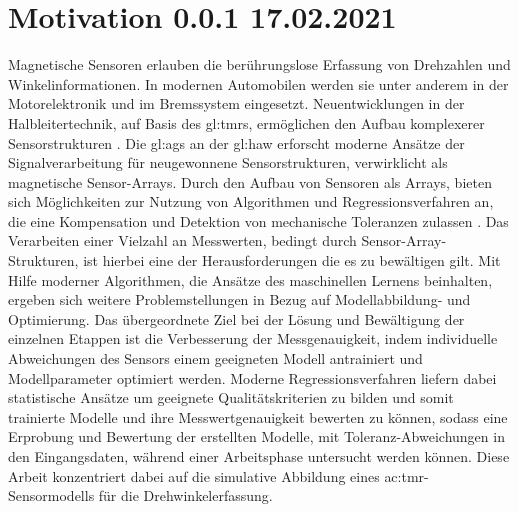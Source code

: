 %

\chapter{Motivation 0.0.1 17.02.2021}\label{ch:motivation}


Magnetische Sensoren erlauben die berührungslose Erfassung von Drehzahlen und Winkelinformationen. In modernen Automobilen werden sie unter anderem in der Motorelektronik und im Bremssystem eingesetzt. Neuentwicklungen in der Halbleitertechnik, auf Basis des \gls{gl:tmr}s, ermöglichen den Aufbau komplexerer Sensorstrukturen \cite{Schuethe2019}. Die \gls{gl:ags} an der \gls{gl:haw} erforscht moderne Ansätze der Signalverarbeitung für neugewonnene Sensorstrukturen, verwirklicht als magnetische Sensor-Arrays. Durch den Aufbau von Sensoren als Arrays, bieten sich Möglichkeiten zur Nutzung von Algorithmen und Regressionsverfahren an, die eine Kompensation und Detektion von mechanische Toleranzen zulassen \cite{Schuethe2020}.
\newline
Das Verarbeiten einer Vielzahl an Messwerten, bedingt durch Sensor-Array-Strukturen, ist hierbei eine der Herausforderungen die es zu bewältigen gilt. Mit Hilfe moderner Algorithmen, die Ansätze des maschinellen Lernens beinhalten, ergeben sich weitere Problemstellungen in Bezug auf Modellabbildung- und Optimierung.
Das übergeordnete Ziel bei der Lösung und Bewältigung der einzelnen Etappen ist die Verbesserung der Messgenauigkeit, indem individuelle Abweichungen des Sensors einem geeigneten Modell antrainiert und Modellparameter optimiert werden.
\newline
Moderne Regressionsverfahren liefern dabei statistische Ansätze um geeignete Qualitätskriterien zu bilden und somit trainierte Modelle und ihre Messwertgenauigkeit bewerten zu können, sodass eine Erprobung und Bewertung der erstellten Modelle, mit Toleranz-Abweichungen in den Eingangsdaten, während einer Arbeitsphase untersucht werden können.
Diese Arbeit konzentriert dabei auf die simulative Abbildung eines \gls{ac:tmr}-Sensormodells für die Drehwinkelerfassung.


\clearpage



